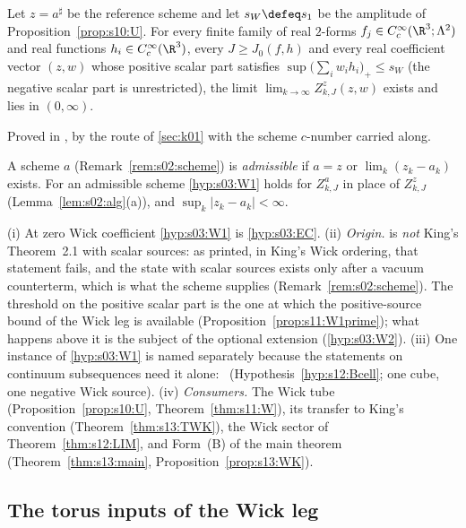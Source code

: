 \begin{theorem}\label{hyp:s03:W1}
Let $z=a^\sharp$ be the reference scheme and let $s_W\defeq s_1$ be the amplitude of Proposition~\ref{prop:s10:U}. For every finite family of real $2$-forms $f_j\in C^\infty_c(\R^3;\Lambda^2)$ and real functions $h_i\in C^\infty_c(\R^3)$, every $J\ge J_0(f,h)$ and every real coefficient vector $(z,w)$ whose positive scalar part satisfies $\sup\big(\sum_iw_ih_i\big)_+\le s_W$ (the negative scalar part is unrestricted), the limit $\lim_{k\to\infty}Z^{z}_{k,J}(z,w)$ exists and lies in $(0,\infty)$.
\end{theorem}
Proved in , by the route of \cref{sec:k01} with the scheme $c$-number carried along.

\begin{definition}\label{def:s03:adm}
A scheme $a$ (Remark~\ref{rem:s02:scheme}) is \emph{admissible} if $a=z$ or $\lim_k(z_k-a_k)$ exists. For an admissible scheme \cref{hyp:s03:W1} holds for $Z^a_{k,J}$ in place of $Z^z_{k,J}$ (Lemma~\ref{lem:s02:alg}(a)), and $\sup_k|z_k-a_k|<\infty$.
\end{definition}

\begin{remark}\label{rem:s03:W1}
(i) At zero Wick coefficient \cref{hyp:s03:W1} is \cref{hyp:s03:EC}.
(ii) \emph{Origin.}  is \emph{not} King's Theorem~2.1 with scalar sources: as printed, in King's Wick ordering, that statement fails, and the state with scalar sources exists only after a vacuum counterterm, which is what the scheme supplies (Remark~\ref{rem:s02:scheme}). The threshold on the positive scalar part is the one at which the positive-source bound of the Wick leg is available (Proposition~\ref{prop:s11:W1prime}); what happens above it is the subject of the optional extension (\cref{hyp:s03:W2}).
(iii) One instance of \cref{hyp:s03:W1} is named separately because the statements on continuum subsequences need it alone: \Bcell\ (Hypothesis~\ref{hyp:s12:Bcell}; one cube, one negative Wick source).
(iv) \emph{Consumers.} The Wick tube (Proposition~\ref{prop:s10:U}, Theorem~\ref{thm:s11:W}), its transfer to King's convention (Theorem~\ref{thm:s13:TWK}), the Wick sector of Theorem~\ref{thm:s12:LIM}, and Form~(B) of the main theorem (Theorem~\ref{thm:s13:main}, Proposition~\ref{prop:s13:WK}).
\end{remark}

\subsection{The torus inputs of the Wick leg}

